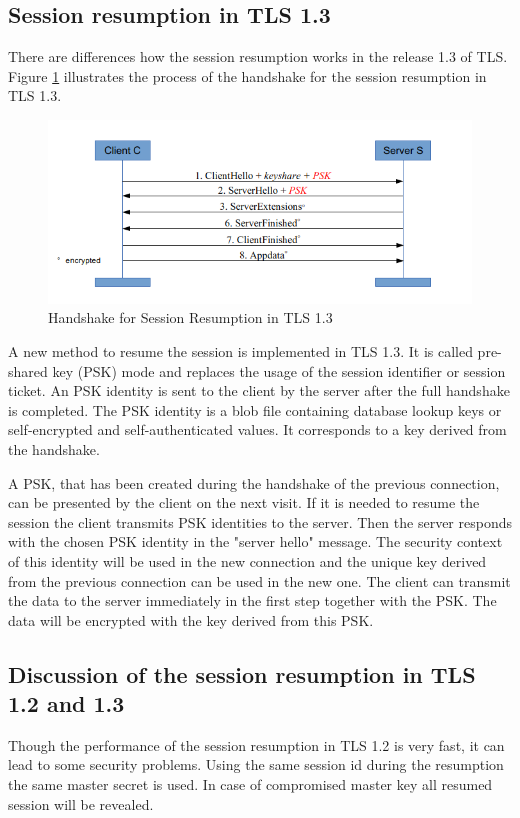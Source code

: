 \subsection{Session resumption in TLS 1.3}
\label{subsec:resumption1_3}

There are differences how the session resumption works in the release 1.3 of TLS. Figure \ref{fig:resumption1_3} illustrates the process of the handshake for the session resumption in TLS 1.3.

\begin{figure}[H]
	\centering
		\includegraphics[scale=0.8]{images/resumption1_3.png}
	\caption{Handshake for Session Resumption in TLS 1.3 \cite{Hassenstein}}
	\label{fig:resumption1_3}
\end{figure}

A new method to resume the session is implemented in TLS 1.3. It is called pre-shared key (PSK) mode and replaces the usage of the session identifier or session ticket. An PSK identity is sent to the client by the server after the full handshake is completed. The PSK identity is a blob file containing database lookup keys or self-encrypted and self-authenticated values. It corresponds to a key derived from the handshake.

A PSK, that has been created during the handshake of the previous connection, can be presented by the client on the next visit. If it is needed to resume the session the client transmits PSK identities to the server. Then the server responds with the chosen PSK identity in the "server hello" message. The security context of this identity will be used in the new connection and the unique key derived from the previous connection can be used in the new one. 
The client can transmit the data to the server immediately in the first step together with the PSK. The data will be encrypted with the key derived from this PSK. \cite{ldapwiki:resumption}

\subsection{Discussion of the session resumption in TLS 1.2 and 1.3}
\label{subsec:discussion_resumption}
Though the performance of the session resumption in TLS 1.2 is very fast, it can lead to some security problems. Using the same session id during the resumption the same master secret is used. In case of compromised master key all resumed session will be revealed.

